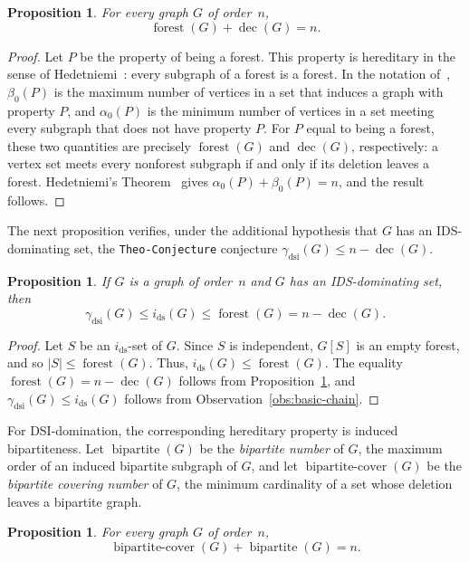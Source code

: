 \documentclass[11pt]{article}
\newtheorem{proposition}[theorem]{Proposition}
\theoremstyle{definition}
\theoremstyle{remark}
\newcommand{\ds}{\mathrm{ds}}
\newcommand{\dsi}{\mathrm{dsi}}
\newcommand{\dec}{\operatorname{dec}}
\newcommand{\forest}{\operatorname{forest}}
\newcommand{\bipnum}{\operatorname{bipartite}}
\newcommand{\bipcov}{\operatorname{bipartite\mbox{-}cover}}
\DeclareRobustCommand{\TheoConjecture}{\texttt{Theo-Conjecture}}
\begin{document}
\begin{proposition}
\label{prop:decycling-forest}
For every graph \(G\) of order~$n$,
\[
   \forest(G)+\dec(G)=n.
\]
\end{proposition}

\begin{proof}
Let \(P\) be the property of being a forest. This property is hereditary in
the sense of Hedetniemi~\cite{Hedetniemi73}: every subgraph of a forest is a
forest. In the notation of~\cite{Hedetniemi73}, \(\beta_0(P)\) is the maximum
number of vertices in a set that induces a graph with property \(P\), and
\(\alpha_0(P)\) is the minimum number of vertices in a set meeting every
subgraph that does not have property \(P\). For \(P\) equal to being a
forest, these two quantities are precisely \(\forest(G)\) and \(\dec(G)\),
respectively: a vertex set meets every nonforest subgraph if and only if its
deletion leaves a forest. Hedetniemi's Theorem~\cite[Theorem~2]{Hedetniemi73}
gives \(\alpha_0(P)+\beta_0(P)=n\), and the result follows.
\end{proof}

The next proposition verifies, under the additional hypothesis that \(G\)
has an IDS-dominating set, the \TheoConjecture{} conjecture
\(\gamma_{\dsi}(G)\le n-\dec(G)\).

\begin{proposition}
\label{prop:ids-forest} If $G$ is a graph of order~$n$ and $G$ has an 
IDS-dominating set, then
\[
   \gamma_{\dsi}(G)\le i_{\ds}(G)\le \forest(G)=n-\dec(G).
\]
\end{proposition}

\begin{proof}
Let \(S\) be an \(i_{\ds}\)-set of \(G\). Since \(S\) is independent,
\(G[S]\) is an empty forest, and so \(|S|\le \forest(G)\). Thus,
\(i_{\ds}(G)\le \forest(G)\). The equality
\(\forest(G)=n-\dec(G)\) follows from
Proposition~\ref{prop:decycling-forest}, and
\(\gamma_{\dsi}(G)\le i_{\ds}(G)\) follows from
Observation~\ref{obs:basic-chain}.
\end{proof}

For DSI-domination, the corresponding hereditary
property is induced bipartiteness. Let \(\bipnum(G)\) be the
\emph{bipartite number} of \(G\), the maximum order of an induced bipartite
subgraph of \(G\), and let \(\bipcov(G)\) be the \emph{bipartite covering
number} of \(G\), the minimum cardinality of a set whose deletion leaves a
bipartite graph.

\begin{proposition}
\label{prop:bipartite-hereditary}
For every graph \(G\) of order~$n$,
\[
   \bipcov(G)+\bipnum(G)=n.
\]
\end{proposition}
\end{document}
